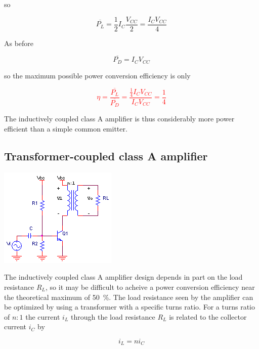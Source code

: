 so

\begin{equation}
\overline{P_{L}} = \frac{1}{2}I_{C}\frac{V_{CC}}{2} = \frac{I_{C}V_{CC}}{4}
\end{equation}

As before

\begin{equation}
\overline{P_{D}} = I_{C}V_{CC}
\end{equation}

so the maximum possible power conversion efficiency is only \autocite[575-576]{microelectronics-neaman}

\textcolor{red}{
\begin{equation}
\eta = \frac{\overline{P_{L}}}{\overline{P_{D}}} = \frac{\frac{1}{4}I_{C}V_{CC}}{I_{C}V_{CC}} = \frac{1}{4}
\end{equation}
}

The inductively coupled class A amplifier is thus considerably more power efficient than a simple common emitter.

\subsection{Transformer-coupled class A amplifier}
\begin{center}
		\includegraphics{schematics/transformercommonemitter.png}
\end{center}
The inductively coupled class A amplifier design depends in part on the load resistance $R_{L}$, so it may be difficult to acheive a power conversion efficiency near the theoretical maximum of \SI{50}{\percent}.
The load resistance seen by the amplifier can be optimized by using a transformer with a specific turns ratio.
For a turns ratio of $n:1$ the current $i_{L}$ through the load resistance $R_{L}$ is related to the collector current $i_{C}$ by

\begin{equation}
i_{L} = ni_{C}
\end{equation}

